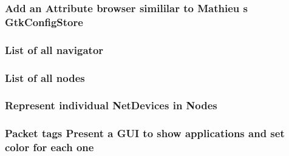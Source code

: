 \subsubsection[{\texorpdfstring{Gtk\+Config\+Store}{GtkConfigStore}}]{\setlength{\rightskip}{0pt plus 5cm}Add an Attribute browser simililar to Mathieu {\bf s} Gtk\+Config\+Store}\hypertarget{visualizer-ideas_8txt_a1b913af5cf121089e2b4e9064cebf2c0}{}\label{visualizer-ideas_8txt_a1b913af5cf121089e2b4e9064cebf2c0}
\subsubsection[{\texorpdfstring{navigator}{navigator}}]{\setlength{\rightskip}{0pt plus 5cm}List of {\bf all} navigator}\hypertarget{visualizer-ideas_8txt_a8254fefcfdbcd9f30e192a246998dd21}{}\label{visualizer-ideas_8txt_a8254fefcfdbcd9f30e192a246998dd21}
\subsubsection[{\texorpdfstring{nodes}{nodes}}]{\setlength{\rightskip}{0pt plus 5cm}List of {\bf all} nodes}\hypertarget{visualizer-ideas_8txt_a3e1b3808014a2c68ab0cd0182e041be2}{}\label{visualizer-ideas_8txt_a3e1b3808014a2c68ab0cd0182e041be2}
\subsubsection[{\texorpdfstring{Nodes}{Nodes}}]{\setlength{\rightskip}{0pt plus 5cm}Represent individual Net\+Devices in Nodes}\hypertarget{visualizer-ideas_8txt_a60b6e773372ae7bea1fe2f0a8246e881}{}\label{visualizer-ideas_8txt_a60b6e773372ae7bea1fe2f0a8246e881}
\subsubsection[{\texorpdfstring{one}{one}}]{\setlength{\rightskip}{0pt plus 5cm}Packet tags Present a G\+UI to show applications and set color for each one}\hypertarget{visualizer-ideas_8txt_a0a84c3fa82a58d60404416317320714e}{}\label{visualizer-ideas_8txt_a0a84c3fa82a58d60404416317320714e}

